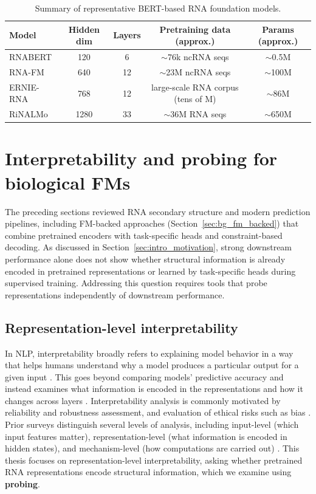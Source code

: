 \documentclass[logo,bsc,singlespacing,parskip]{infthesis}
\begin{document}
\begin{table}[t]
\centering
\small
\caption{Summary of representative BERT-based RNA foundation models.}
\label{tab:bg_model_summary}
\begin{tabular}{lcccc}
\toprule
\textbf{Model} & \textbf{Hidden dim} & \textbf{Layers} & \textbf{Pretraining data (approx.)} & \textbf{Params (approx.)} \\
\midrule
RNABERT & 120 & 6 & $\sim$76k ncRNA seqs & $\sim$0.5M \\
RNA-FM & 640 & 12 & $\sim$23M ncRNA seqs & $\sim$100M \\
ERNIE-RNA & 768 & 12 & large-scale RNA corpus (tens of M) & $\sim$86M \\
RiNALMo & 1280 & 33 & $\sim$36M RNA seqs & $\sim$650M \\
\bottomrule
\end{tabular}
\end{table}
\vspace{-1.0em}

\section{Interpretability and probing for biological FMs}
\label{sec:bg_interpretability}
The preceding sections reviewed RNA secondary structure and 
modern prediction pipelines, including FM-backed approaches 
(Section~\ref{sec:bg_fm_backed}) that combine pretrained 
encoders with task-specific heads and constraint-based decoding.
As discussed in Section~\ref{sec:intro_motivation}, strong downstream performance alone does not show whether structural information is already encoded in pretrained representations or learned by task-specific heads during supervised training. Addressing this question requires tools that probe representations independently of downstream performance.

\subsection{Representation-level interpretability}
In NLP, interpretability broadly refers to explaining model behavior in a way that helps humans understand why a model produces a particular output for a given input \citep{doshi2017towards,belinkov2022probing}. This goes beyond comparing models' predictive accuracy and instead examines what information is encoded in the representations and how it changes across layers \citep{rogers2020primer,belinkov2022probing}. Interpretability analysis is commonly motivated by reliability and robustness assessment, and evaluation of ethical risks such as bias \citep{ribeiro2016trust,sundararajan2017axiomatic,barocas2016big}. Prior surveys distinguish several levels of analysis, including input-level (which input features matter), representation-level (what information is encoded in hidden states), and mechanism-level (how computations are carried out) \citep{belinkov2019analysis,danilevsky2020survey}. 
This thesis focuses on representation-level interpretability, asking whether pretrained RNA representations encode structural information, which we examine using \textbf{probing}.
\end{document}
